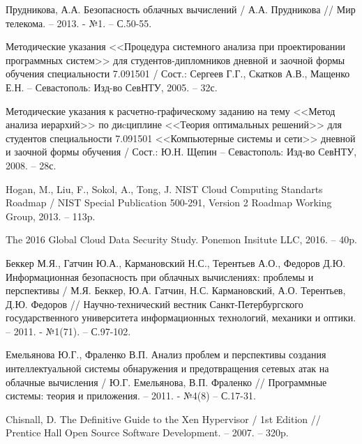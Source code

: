 \begingroup 
\renewcommand{\section}[2]{\anonsection{Библиографический список}}
\begin{thebibliography}{00}

    Прудникова, А.А.
    Безопасность облачных вычислений /
    А.А. Прудникова //
    Мир телекома. -- 2013. - №1.
    -- С.50-55.

    Методические указания <<Процедура системного анализа при проектировании программных систем>>
    для студентов-дипломников дневной и заочной формы обучения специальности 7.091501 /
    Сост.: Сергеев Г.Г., Скатков А.В., Мащенко Е.Н. -- Севастополь:
    Изд-во СевНТУ, 2005. -- 32с.

    Методические указания к расчетно-графическому заданию
    на тему <<Метод анализа иерархий>>  по диcциплине <<Теория оптимальных решений>>
    для студентов специальности 7.091501 <<Компьютерные системы и сети>>
    дневной и заочной формы обучения /
    Сост.: Ю.Н. Щепин -- Севастополь:
    Изд-во СевНТУ, 2008. -- 28с.

    Hogan, M., Liu, F., Sokol, A., Tong, J.
    NIST Cloud Computing Standarts Roadmap /
    NIST Special Publication 500-291, Version 2
    Roadmap Working Group, 2013. -- 113p.

    The 2016 Global Cloud Data Security Study.
    Ponemon Insitute LLC, 2016. -- 40p.

    Беккер М.Я., Гатчин Ю.А., Кармановский Н.С., Терентьев А.О., Федоров Д.Ю.
    Информационная безопасность при облачных вычислениях: проблемы и перспективы /
    М.Я. Беккер, Ю.А. Гатчин, Н.С. Кармановский, А.О. Терентьев, Д.Ю. Федоров //
    Научно-технический вестник Санкт-Петербургского государственного университета информационных технологий, механики и оптики. -- 2011. - №1(71).
    -- С.97-102.

    Емельянова Ю.Г., Фраленко В.П.
    Анализ проблем и перспективы создания интеллектуальной системы обнаружения и предотвращения сетевых атак на облачные вычисления /
    Ю.Г. Емельянова, В.П. Фраленко //
    Программные системы: теория и приложения. -- 2011. - №4(8)
    -- С.17-31.

    Chisnall, D.
    The Definitive Guide to the Xen Hypervisor /
    1st Edition //
    Prentice Hall Open Source Software Development. -- 2007. -- 320p.

\end{thebibliography}
\endgroup

\clearpage
